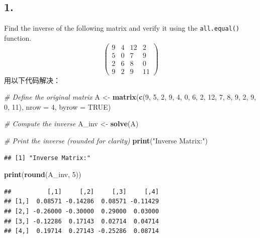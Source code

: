 \documentclass[
]{article}
\newenvironment{Shaded}{\begin{snugshade}}{\end{snugshade}}
\newcommand{\AttributeTok}[1]{\textcolor[rgb]{0.13,0.29,0.53}{#1}}
\newcommand{\CommentTok}[1]{\textcolor[rgb]{0.56,0.35,0.01}{\textit{#1}}}
\newcommand{\ConstantTok}[1]{\textcolor[rgb]{0.56,0.35,0.01}{#1}}
\newcommand{\DecValTok}[1]{\textcolor[rgb]{0.00,0.00,0.81}{#1}}
\newcommand{\FunctionTok}[1]{\textcolor[rgb]{0.13,0.29,0.53}{\textbf{#1}}}
\newcommand{\NormalTok}[1]{#1}
\newcommand{\OtherTok}[1]{\textcolor[rgb]{0.56,0.35,0.01}{#1}}
\newcommand{\StringTok}[1]{\textcolor[rgb]{0.31,0.60,0.02}{#1}}
\begin{document}
\subsection{1.}\label{section}

Find the inverse of the following matrix and verify it using the
\texttt{all.equal()} function. \[
\left(\begin{array}{cccc}
9 & 4 & 12 & 2 \\
5 & 0 & 7 & 9 \\
2 & 6 & 8 & 0 \\
9 & 2 & 9 & 11
\end{array}\right) 
\] 用以下代码解决：

\begin{Shaded}
\begin{Highlighting}[]
\CommentTok{\# Define the original matrix}
\NormalTok{A }\OtherTok{\textless{}{-}} \FunctionTok{matrix}\NormalTok{(}\FunctionTok{c}\NormalTok{(}\DecValTok{9}\NormalTok{, }\DecValTok{5}\NormalTok{, }\DecValTok{2}\NormalTok{, }\DecValTok{9}\NormalTok{,}
              \DecValTok{4}\NormalTok{, }\DecValTok{0}\NormalTok{, }\DecValTok{6}\NormalTok{, }\DecValTok{2}\NormalTok{,}
              \DecValTok{12}\NormalTok{, }\DecValTok{7}\NormalTok{, }\DecValTok{8}\NormalTok{, }\DecValTok{9}\NormalTok{,}
              \DecValTok{2}\NormalTok{, }\DecValTok{9}\NormalTok{, }\DecValTok{0}\NormalTok{, }\DecValTok{11}\NormalTok{), }
            \AttributeTok{nrow =} \DecValTok{4}\NormalTok{, }\AttributeTok{byrow =} \ConstantTok{TRUE}\NormalTok{)}

\CommentTok{\# Compute the inverse}
\NormalTok{A\_inv }\OtherTok{\textless{}{-}} \FunctionTok{solve}\NormalTok{(A)}

\CommentTok{\# Print the inverse (rounded for clarity)}
\FunctionTok{print}\NormalTok{(}\StringTok{"Inverse Matrix:"}\NormalTok{)}
\end{Highlighting}
\end{Shaded}

\begin{verbatim}
## [1] "Inverse Matrix:"
\end{verbatim}

\begin{Shaded}
\begin{Highlighting}[]
\FunctionTok{print}\NormalTok{(}\FunctionTok{round}\NormalTok{(A\_inv, }\DecValTok{5}\NormalTok{))}
\end{Highlighting}
\end{Shaded}

\begin{verbatim}
##          [,1]     [,2]     [,3]     [,4]
## [1,]  0.08571 -0.14286  0.08571 -0.11429
## [2,] -0.26000 -0.30000  0.29000  0.03000
## [3,] -0.12286  0.17143  0.02714  0.04714
## [4,]  0.19714  0.27143 -0.25286  0.08714
\end{verbatim}
\end{document}
